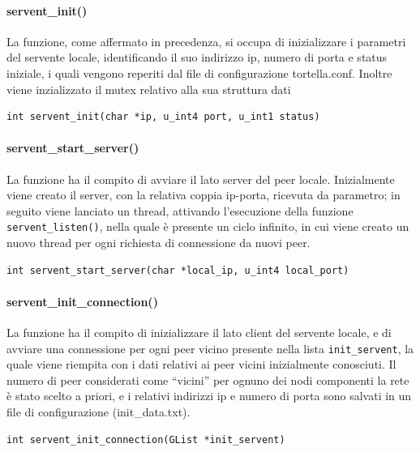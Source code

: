 \paragraph{servent\_init()}
La funzione, come affermato in precedenza, si occupa di inizializzare i parametri del servente locale, identificando  il suo indirizzo ip, numero di porta e status iniziale, i quali vengono reperiti dal file di configurazione tortella.conf. Inoltre viene inzializzato il mutex relativo alla sua struttura dati
\begin{lstlisting}
int servent_init(char *ip, u_int4 port, u_int1 status)
\end{lstlisting}
\paragraph{servent\_start\_server()}
La funzione ha il compito di avviare il lato server del peer locale. Inizialmente viene creato il server, con la relativa coppia ip-porta, ricevuta da parametro; in seguito viene lanciato un thread, attivando l'esecuzione della funzione \texttt{servent\_listen()}, nella quale è presente un ciclo infinito, in cui viene creato un nuovo thread per ogni richiesta di connessione da nuovi peer.
\begin{lstlisting}
int servent_start_server(char *local_ip, u_int4 local_port)
\end{lstlisting}
\paragraph{servent\_init\_connection()}
La funzione ha il compito di inizializzare il lato client del servente locale, e di avviare una connessione per ogni peer vicino presente nella lista \texttt{init\_servent}, la quale viene riempita con i dati relativi ai peer vicini inizialmente conosciuti. Il numero di peer considerati come “vicini” per ognuno dei nodi componenti la rete è stato scelto a priori, e  i relativi indirizzi ip e numero di porta sono salvati in un file di configurazione (init\_data.txt). 
\begin{lstlisting}  
int servent_init_connection(GList *init_servent)
\end{lstlisting}
